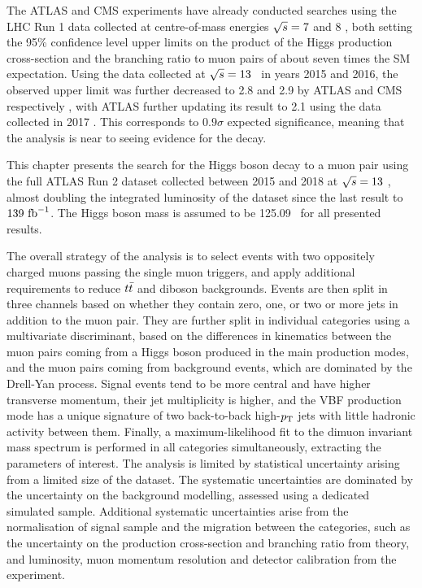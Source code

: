 The ATLAS and CMS experiments have already conducted searches using
the LHC Run 1 data collected at centre-of-mass energies $\sqrt{s} = 7$
and 8 \TeV, both setting the 95\% confidence level upper limits on the
product of the Higgs production cross-section and the branching ratio
to muon pairs \cite{Aad:2014xva, Khachatryan:2014aep} of about seven
times the SM expectation. Using the data collected at $\sqrt{s} = 13$
\TeV~in years 2015 and 2016, the observed upper limit was further
decreased to 2.8 and 2.9 by ATLAS and CMS respectively
\cite{Aaboud:2017ojs, CMS-PAS-HIG-17-019}, with ATLAS
further updating its result to 2.1 using the data collected in 2017
\cite{ATLAS-CONF-2018-026}. This corresponds to $0.9 \sigma$ expected
significance, meaning that the analysis is near to seeing evidence
for the decay.

This chapter presents the search for the Higgs boson decay to a muon
pair using the full ATLAS Run 2 dataset collected between 2015 and 2018
at $\sqrt{s} = 13$ \TeV, almost doubling the integrated luminosity of
the dataset since the last result to $139~\text{fb}^{-1}$. The Higgs boson mass
is assumed to be 125.09 \GeV~for all presented results.

The overall strategy of the analysis is to select events with
two oppositely charged muons passing the single muon triggers,
and apply additional requirements
to reduce $t\bar{t}$ and diboson backgrounds. Events are then split
in three channels based on whether they contain zero, one, or two or
more jets in addition to the muon pair. They are further split in
individual categories using a multivariate discriminant, based
on the differences in kinematics between the muon pairs coming
from a Higgs boson produced in the main production modes, and the
muon pairs coming from background events, which are dominated by
the Drell-Yan process. Signal events tend to be more central and
have higher transverse momentum, their jet multiplicity is higher,
and the VBF production mode has a unique signature of two 
back-to-back high-$p_{\text{T}}$ jets with little hadronic activity between
them. Finally, a maximum-likelihood fit to the dimuon invariant mass
spectrum is performed in all categories simultaneously, extracting
the parameters of interest. The analysis is limited by
statistical uncertainty arising from a limited size of the dataset.
The systematic uncertainties are dominated by the uncertainty on
the background modelling, assessed using a dedicated simulated sample.
Additional systematic uncertainties arise from the normalisation 
of signal sample and the migration between the categories, such as
the uncertainty on the production cross-section and branching ratio
from theory, and luminosity, muon momentum resolution
and detector calibration from the experiment.

